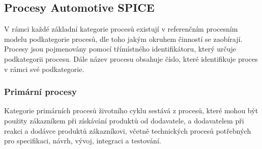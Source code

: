 \documentclass[czech,master,public,dept460,male,cpdeclaration,oneside]{diploma}
\begin{document}





\subsection{Procesy Automotive SPICE}
\label{sec:aspice_processes}
V rámci každé základní kategorie procesů existují v referenčním procesním modelu podkategorie procesů, dle toho jakým okruhem činností se zaobírají. Procesy jsou pojmenovány pomocí třímístného identifikátoru, který určuje podkategorii procesu. Dále název procesu obsahuje číslo, které identifikuje proces v rámci své podkategorie.

\subsubsection{Primární procesy}
Kategorie primárních procesů životního cyklu sestává z procesů, které mohou být použity zákazníkem při získávání produktů od dodavatele, a dodavatelem při reakci a dodávce produktů zákazníkovi, včetně technických procesů potřebných pro specifikaci, návrh, vývoj, integraci a testování.
\end{document}
